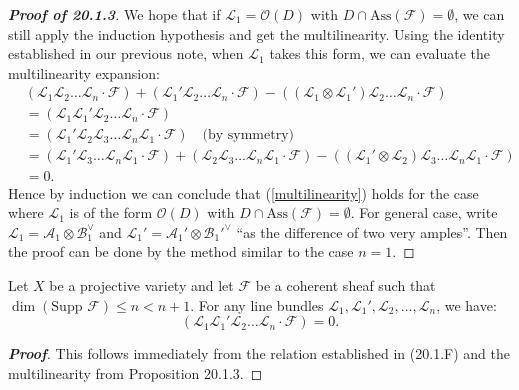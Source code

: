 \begin{proof}[\textbf{Proof of 20.1.3}]
We hope that if $\mathcal{L}_1=\mathcal{O}(D)$ with $D \cap \text{Ass}(\mathcal{F}) = \emptyset$, we can still apply the induction hypothesis and get the multilinearity.
Using the identity established in our previous note, when $\mathcal{L}_1$ takes this form, we can evaluate the multilinearity expansion:
\begin{align*}
&(\mathcal{L}_1 \mathcal{L}_2 \dots \mathcal{L}_n \cdot \mathcal{F}) + (\mathcal{L}_1' \mathcal{L}_2 \dots \mathcal{L}_n \cdot \mathcal{F}) - ((\mathcal{L}_1 \otimes \mathcal{L}_1') \mathcal{L}_2 \dots \mathcal{L}_n \cdot \mathcal{F}) \\
&= (\mathcal{L}_1 \mathcal{L}_1' \mathcal{L}_2 \dots \mathcal{L}_n \cdot \mathcal{F}) \\
&= (\mathcal{L}_1' \mathcal{L}_2 \mathcal{L}_3 \dots \mathcal{L}_n \mathcal{L}_1 \cdot \mathcal{F}) \quad \text{(by symmetry)} \\
&= (\mathcal{L}_1' \mathcal{L}_3 \dots \mathcal{L}_n \mathcal{L}_1 \cdot \mathcal{F}) + (\mathcal{L}_2 \mathcal{L}_3 \dots \mathcal{L}_n \mathcal{L}_1 \cdot \mathcal{F}) - ((\mathcal{L}_1' \otimes \mathcal{L}_2) \mathcal{L}_3 \dots \mathcal{L}_n \mathcal{L}_1 \cdot \mathcal{F}) \\
&= 0.
\end{align*}
Hence by induction we can conclude that (\ref{multilinearity}) holds for the case where $\mathcal{L}_1$ is of the form $\mathcal{O}(D)$ with $D \cap \text{Ass}(\mathcal{F}) = \emptyset$.
For general case,
write $\mathcal{L}_1=\mathcal{A}_1 \otimes \mathcal{B}_1^\vee$ and $\mathcal{L}_1'=\mathcal{A}_1' \otimes \mathcal{B}_1'^\vee$ “as the difference
of two very amples”. 
Then the proof can be done by the method similar to the case $n=1$.
\end{proof}

\begin{corollary}[20.1.H]
Let $X$ be a projective variety and let $\mathcal{F}$ be a coherent sheaf such that $\dim(\text{Supp } \mathcal{F}) \leq n < n+1$. For any line bundles $\mathcal{L}_1, \mathcal{L}_1', \mathcal{L}_2, \dots, \mathcal{L}_n$, we have:
\[
(\mathcal{L}_1 \mathcal{L}_1' \mathcal{L}_2 \dots \mathcal{L}_n \cdot \mathcal{F}) = 0.
\]
\end{corollary}

\begin{proof}[\textbf{Proof}]
This follows immediately from the relation established in (20.1.F) and the multilinearity from Proposition 20.1.3.
\end{proof}

